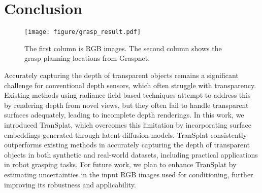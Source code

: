 \section{Conclusion}
\label{sec:conclusion}
\begin{figure}[!t]
    \centering
    \texttt{[image: figure/grasp\_result.pdf]}
    \caption{The first column is RGB images. The second column shows the grasp planning locations from Graspnet. }
    \label{fig:grasp_result}
    \vspace{-5mm}
\end{figure}

Accurately capturing the depth of transparent objects remains a significant challenge for conventional depth sensors, which often struggle with transparency. Existing methods using radiance field-based techniques attempt to address this by rendering depth from novel views, but they often fail to handle transparent surfaces adequately, leading to incomplete depth renderings. In this work, we introduced TranSplat, which overcomes this limitation by incorporating surface embeddings generated through latent diffusion models. TranSplat consistently outperforms existing methods in accurately capturing the depth of transparent objects in both synthetic and real-world datasets, including practical applications in robot grasping tasks. For future work, we plan to enhance TranSplat by estimating uncertainties in the input RGB images used for conditioning, further improving its robustness and applicability.





\newpage